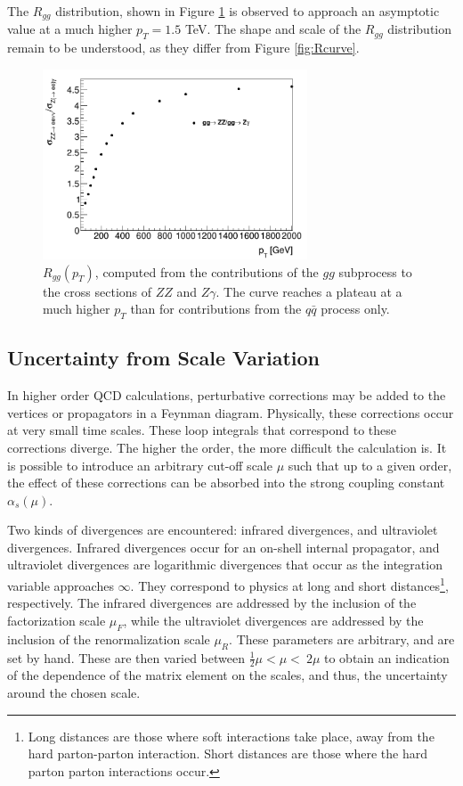 \documentclass[11pt,a4paper,openright,twoside]{report}
\begin{document}
The $R_{gg}$ distribution, shown in Figure \ref{fig:R_ggonly} is observed to approach an asymptotic value at a much higher $p_T = 1.5$ TeV. The shape and scale of the $R_{gg}$ distribution remain to be understood, as they differ from Figure \ref{fig:Rcurve}.
\begin{figure}[H]
\centering
\includegraphics[width=0.7\textwidth]{R_ggonly.png}
\caption{$R_{gg}(p_T)$, computed from the contributions of the $gg$ subprocess to the cross sections of $ZZ$ and $Z\gamma$. The curve reaches a plateau at a much higher $p_T$ than for contributions from the $q\bar{q}$ process only.}
\label{fig:R_ggonly}
\end{figure}

\subsection{Uncertainty from Scale Variation}
In higher order QCD calculations, perturbative corrections may be added to the vertices or propagators in a Feynman diagram. Physically, these corrections occur at very small time scales. These loop integrals that correspond to these corrections diverge. The higher the order, the more difficult the calculation is. It is possible to introduce an arbitrary cut-off scale $\mu$ such that up to a given order, the effect of these corrections can be absorbed into the strong coupling constant $\alpha_s(\mu)$.

Two kinds of divergences are encountered: infrared divergences, and ultraviolet divergences. Infrared divergences occur for an on-shell internal propagator, and ultraviolet divergences are logarithmic divergences that occur as the integration variable approaches $\infty$. They correspond to physics at long and short distances\footnote{Long distances are those where soft interactions take place, away from the hard parton-parton interaction. Short distances are those where the hard parton parton interactions occur.}, respectively. The infrared divergences are addressed by the inclusion of the factorization scale $\mu_F$, while the ultraviolet divergences are addressed by the inclusion of the renormalization scale $\mu_R$. These parameters are arbitrary, and are set by hand. These are then varied between $\frac{1}{2}\mu < \mu < \ 2\mu$ to obtain an indication of the dependence of the matrix element on the scales, and thus, the uncertainty around the chosen scale. 
\end{document}
